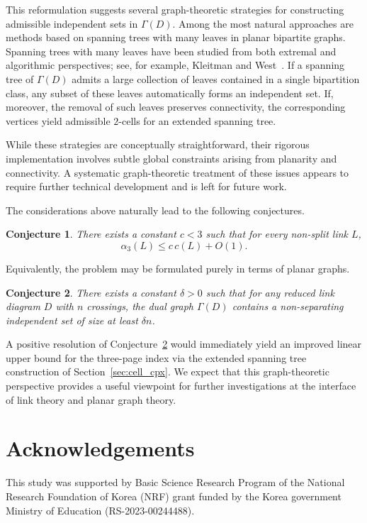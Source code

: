 \documentclass[11pt,a4paper]{amsart}
\newtheorem{conjecture}{Conjecture}
\begin{document}
This reformulation suggests several graph-theoretic strategies
for constructing admissible independent sets in $\Gamma(D)$.
Among the most natural approaches are methods based on
spanning trees with many leaves in planar bipartite graphs.
Spanning trees with many leaves have been studied from both extremal
and algorithmic perspectives; see, for example,
Kleitman and West~\cite{KW}.
If a spanning tree of $\Gamma(D)$ admits a large collection of leaves
contained in a single bipartition class,
any subset of these leaves automatically forms an independent set.
If, moreover, the removal of such leaves preserves connectivity,
the corresponding vertices yield admissible $2$-cells
for an extended spanning tree.

While these strategies are conceptually straightforward,
their rigorous implementation involves subtle global constraints
arising from planarity and connectivity.
A systematic graph-theoretic treatment of these issues
appears to require further technical development
and is left for future work.

The considerations above naturally lead to the following conjectures.

\begin{conjecture}\label{conj:linear_improvement}
There exists a constant $c<3$ such that for every non-split link $L$,
$$
\alpha_3(L)\le c\,c(L)+O(1).
$$
\end{conjecture}

Equivalently, the problem may be formulated purely in terms of planar graphs.

\begin{conjecture}\label{conj:nonsep_independent}
There exists a constant $\delta>0$ such that for any reduced link diagram
$D$ with $n$ crossings, the dual graph $\Gamma(D)$ contains
a non-separating independent set of size at least $\delta n$.
\end{conjecture}

A positive resolution of Conjecture~\ref{conj:nonsep_independent}
would immediately yield an improved linear upper bound for the
three-page index via the extended spanning tree construction
of Section~\ref{sec:cell_cpx}.
We expect that this graph-theoretic perspective provides a useful viewpoint
for further investigations at the interface of
link theory and planar graph theory.




\section*{Acknowledgements}
This study was supported by Basic Science Research Program of the National Research Foundation of Korea (NRF) grant funded by the Korea government Ministry of Education (RS-2023-00244488).



	
 

	
\end{document}
